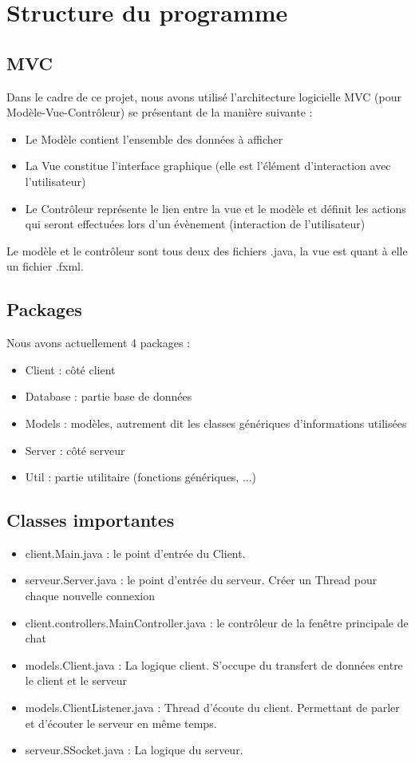 \documentclass[11pt]{article}
\begin{document}
    \section{Structure du programme}
    \subsection{MVC}
    Dans le cadre de ce projet, nous avons utilisé l'architecture logicielle MVC (pour Modèle-Vue-Contrôleur) se présentant de la manière suivante :
    \begin{itemize}
        \item Le Modèle contient l'ensemble des données à afficher
        \item La Vue constitue l'interface graphique (elle est l'élément d'interaction avec l'utilisateur)
        \item Le Contrôleur représente le lien entre la vue et le modèle et définit les actions qui seront effectuées lors d'un évènement (interaction de l'utilisateur)
    \end{itemize}
    Le modèle et le contrôleur sont tous deux des fichiers .java, la vue est quant à elle un fichier .fxml.

    \subsection{Packages}
    Nous avons actuellement 4 packages :

    \begin{itemize}
        \item Client : côté client
        \item Database : partie base de données
        \item Models : modèles, autrement dit les classes génériques d’informations utilisées
        \item Server : côté serveur
        \item Util : partie utilitaire (fonctions génériques, ...)
    \end{itemize}


    \subsection{Classes importantes}

    \begin{itemize}
        \item client.Main.java : le point d'entrée du Client.
        \item serveur.Server.java : le point d'entrée du serveur. Créer un Thread pour chaque nouvelle connexion
        \item client.controllers.MainController.java : le contrôleur de la fenêtre principale de chat
        \item models.Client.java : La logique client. S'occupe du transfert de données entre le client et le serveur
        \item models.ClientListener.java : Thread d'écoute du client. Permettant de parler et d'écouter le serveur en même temps.
        \item serveur.SSocket.java : La logique du serveur.
    \end{itemize}
\end{document}
